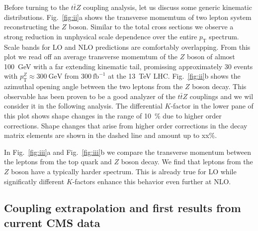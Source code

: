 \documentclass[preprint]{JHEP3} %
\newcommand{\GeV}{\mathrm{GeV}}
\newcommand{\pT}{p_{\mathrm{T}}}
\def\ttbZ{t\bar{t}Z}
\begin{document}
Before turning to the $\ttbZ$ coupling analysis, let us discuss some generic kinematic distributions.
Fig.~\ref{fig:ii}a shows the transverse momemtum of two lepton system reconstructing the $Z$ boson.
Similar to the total cross sections we observe a strong reduction in unphysical scale dependence over the entire $\pT$ spectrum.
Scale bands for LO and NLO predictions are comfortably overlapping. 
From this plot we read off an average transverse momemtum of the $Z$ boson of almost 100~GeV with a far extending kinematic tail,
promissing approximately 30 events with $\pT^Z \approx 300~\GeV$ from $300~\mathrm{fb}^{-1}$ at the 13~TeV LHC. 
Fig.~\ref{fig:ii}b shows the azimuthal opening angle between the two leptons from the $Z$ boson decay.
This observable has been proven to be a good analyzer of the $\ttbZ$ couplings \cite{Baur:2004uw} and we wil consider it in the following analysis.
The differential $K$-factor in the lower pane of this plot shows shape changes in the range of 10~\% due to higher order corrections.
Shape changes that arise from higher order corrections in the decay matrix elements are shown in the dashed line and amount up to xx\%.



In Fig.~\ref{fig:iii}a and Fig.~\ref{fig:iii}b we compare the transverse momentum between the leptons from the top quark and $Z$ boson decay.
We find that leptons from the $Z$ boson have a typically harder spectrum. 
This is already true for LO while significatly different $K$-factors enhance this behavior even further at NLO.

\subsection{Coupling extrapolation and first results from current CMS data}
\label{sect:CMS}
\end{document}
